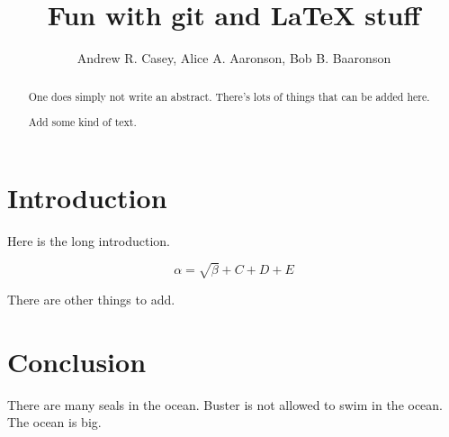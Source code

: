 \documentclass{article}
\begin{document}
\title{Fun with git and \LaTeX{} stuff}
\author{Andrew R. Casey, Alice A. Aaronson, Bob B. Baaronson}

\maketitle

\begin{abstract}
One does simply not write an abstract. There's lots of things that can be added here.

Add some kind of text.
\end{abstract}

\section{Introduction}
Here is the long introduction.

\begin{equation}
    \label{simple_equation}
    \alpha = \sqrt{ \beta } + C + D + E
\end{equation}

There are other things to add.

\section{Conclusion}
There are many seals in the ocean. Buster is not allowed to swim in the ocean. The ocean is big.
\end{document}
